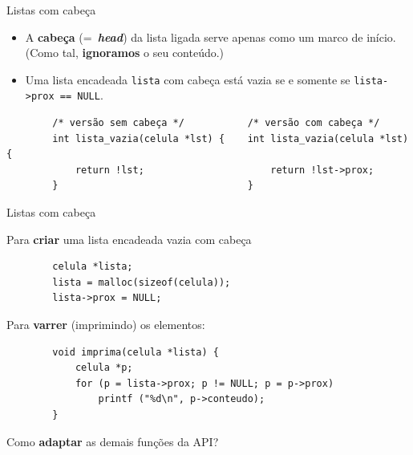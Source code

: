 \documentclass{beamer}
\newcommand{\cod}[1]{\texttt{#1}}
\newcommand{\textcolortwo}[2]{\textcolor{#1}{#2}}
\newcommand{\textblue}[1]{\textcolortwo{uiblue}{#1}}
\newcommand{\textbblue}[1]{\textbf{\textblue{#1}}}
\begin{document}
\begin{frame}[fragile]{Listas com cabeça}
    \begin{itemize}
        \item A \textbblue{cabeça} (=~\textbf{\emph{head}}) da lista ligada serve apenas como um marco de início.
        (Como tal, \textbf{ignoramos} o seu conteúdo.)
        \item Uma lista encadeada \cod{lista} com cabeça está vazia se e somente se \cod{lista->prox == NULL}.
    \end{itemize}

    \begin{verbatim}
        /* versão sem cabeça */           /* versão com cabeça */
        int lista_vazia(celula *lst) {    int lista_vazia(celula *lst) {
            return !lst;                      return !lst->prox;
        }                                 }
    \end{verbatim}

\end{frame}

\begin{frame}[fragile]{Listas com cabeça}

    Para \textbf{criar} uma lista encadeada vazia com cabeça
    \begin{verbatim}
        celula *lista;
        lista = malloc(sizeof(celula));
        lista->prox = NULL;
    \end{verbatim}

    Para \textbf{varrer} (imprimindo) os elementos:
    \begin{verbatim}
        void imprima(celula *lista) {
            celula *p;
            for (p = lista->prox; p != NULL; p = p->prox)
                printf ("%d\n", p->conteudo);
        }
    \end{verbatim}

    Como \textbf{adaptar} as demais funções da API?
\end{frame}
\end{document}
